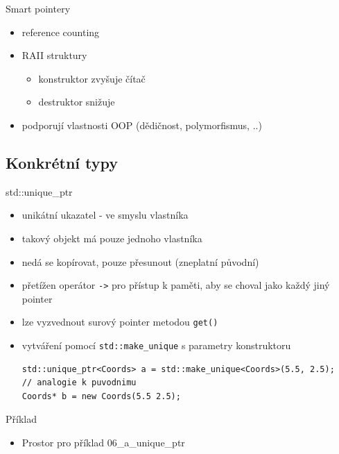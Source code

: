 \documentclass{beamer}
\begin{document}
\begin{xframe}{Smart pointery}
	\begin{itemize}
		\item reference counting
		\item RAII struktury
			\begin{itemize}
				\item konstruktor zvyšuje čítač
				\item destruktor snižuje
			\end{itemize}
		\item podporují vlastnosti OOP (dědičnost, polymorfismus, ..)
	\end{itemize}
\end{xframe}

\subsection{Konkrétní typy}

\begin{xframe}{std::unique\_ptr}
	\begin{itemize}
		\item unikátní ukazatel - ve smyslu vlastníka
		\item takový objekt má pouze jednoho vlastníka
		\item nedá se kopírovat, pouze přesunout (zneplatní původní)
		\item přetížen operátor \texttt{->} pro přístup k paměti, aby se choval jako každý jiný pointer
		\item lze vyzvednout surový pointer metodou \texttt{get()}
		\item vytváření pomocí \texttt{std::make\_unique} s parametry konstruktoru
\begin{lstlisting}[basicstyle=\fontsize{8}{9}\selectfont\ttfamily]
std::unique_ptr<Coords> a = std::make_unique<Coords>(5.5, 2.5);
// analogie k puvodnimu
Coords* b = new Coords(5.5 2.5);
\end{lstlisting}
	\end{itemize}
\end{xframe}

\begin{xframe}{Příklad}
	\begin{itemize}
		\item Prostor pro příklad 06\_a\_unique\_ptr
	\end{itemize}
\end{xframe}
\end{document}
